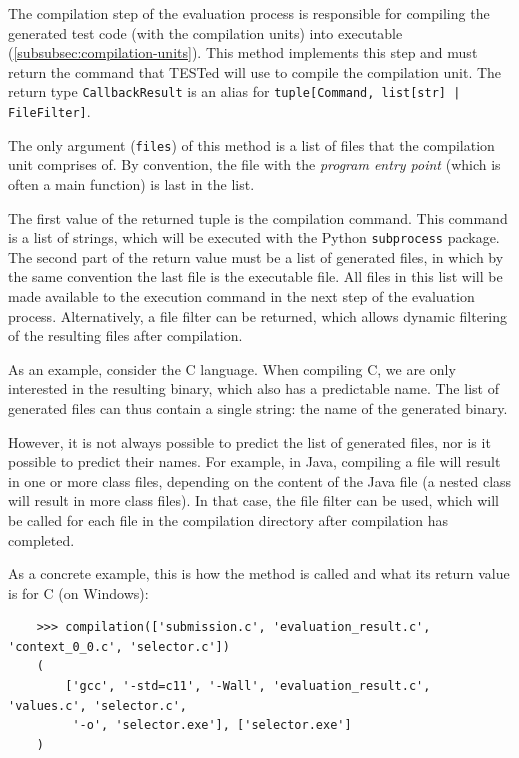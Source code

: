 \documentclass[../main]{subfiles}
\begin{document}
The compilation step of the evaluation process is responsible for compiling the generated test code (with the compilation units) into executable (\cref{subsubsec:compilation-units}).
This method implements this step and must return the command that TESTed will use to compile the compilation unit.
The return type \texttt{CallbackResult} is an alias for \texttt{tuple[Command, list[str] | FileFilter]}.

The only argument (\texttt{files}) of this method is a list of files that the compilation unit comprises of.
By convention, the file with the \emph{program entry point} (which is often a main function) is last in the list.

The first value of the returned tuple is the compilation command.
This command is a list of strings, which will be executed with the Python \texttt{subprocess} package.
The second part of the return value must be a list of generated files, in which by the same convention the last file is the executable file.
All files in this list will be made available to the execution command in the next step of the evaluation process.
Alternatively, a file filter can be returned, which allows dynamic filtering of the resulting files after compilation.

As an example, consider the C language.
When compiling C, we are only interested in the resulting binary, which also has a predictable name.
The list of generated files can thus contain a single string: the name of the generated binary.

However, it is not always possible to predict the list of generated files, nor is it possible to predict their names.
For example, in Java, compiling a file will result in one or more class files, depending on the content of the Java file (a nested class will result in more class files).
In that case, the file filter can be used, which will be called for each file in the compilation directory after compilation has completed.

As a concrete example, this is how the method is called and what its return value is for C (on Windows):

\begin{verbatim}
    >>> compilation(['submission.c', 'evaluation_result.c', 'context_0_0.c', 'selector.c'])
    (
        ['gcc', '-std=c11', '-Wall', 'evaluation_result.c', 'values.c', 'selector.c',
         '-o', 'selector.exe'], ['selector.exe']
    )
\end{verbatim}
\end{document}
